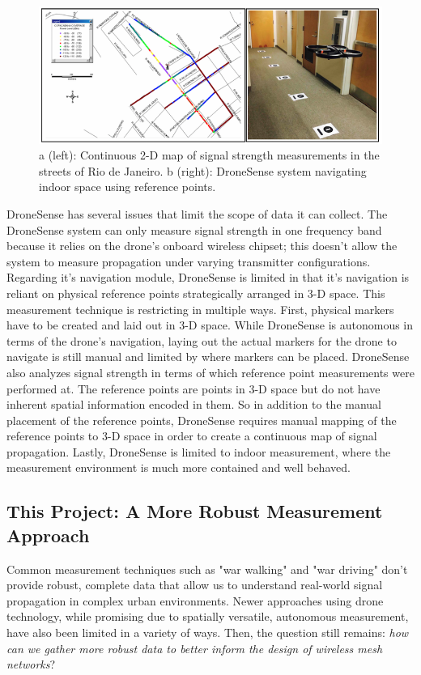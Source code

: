 \documentclass[pageno]{jpaper}
\begin{document}
\begin{figure}[h]
	\caption[Related measurement campaigns]{a (left): Continuous 2-D map of signal strength measurements in the streets of Rio de Janeiro\cite{urban}. b (right): DroneSense system navigating indoor space using reference points\cite{dronesense}.}
	\includegraphics{related_work}
	\centering
\end{figure}

DroneSense has several issues that limit the scope of data it can collect. The DroneSense system can only measure signal strength in one frequency band because it relies on the drone's onboard wireless chipset; this doesn't allow the system to measure propagation under varying transmitter configurations. Regarding it's navigation module, DroneSense is limited in that it's navigation is reliant on physical reference points strategically arranged in 3-D space. This measurement technique is restricting in multiple ways. First, physical markers have to be created and laid out in 3-D space. While DroneSense is autonomous in terms of the drone's navigation, laying out the actual markers for the drone to navigate is still manual and limited by where markers can be placed. DroneSense also analyzes signal strength in terms of which reference point measurements were performed at. The reference points are points in 3-D space but do not have inherent spatial information encoded in them. So in addition to the manual placement of the reference points, DroneSense requires manual mapping of the reference points to 3-D space in order to create a continuous map of signal propagation. Lastly, DroneSense is limited to indoor measurement, where the measurement environment is much more contained and well behaved. 

\subsection{This Project: A More Robust Measurement Approach}
Common measurement techniques such as "war walking" and "war driving" don't provide robust, complete data that allow us to understand real-world signal propagation in complex urban environments. Newer approaches using drone technology, while promising due to spatially versatile, autonomous measurement, have also been limited in a variety of ways. Then, the question still remains: \textit{how can we gather more robust data to better inform the design of wireless mesh networks}?
\end{document}
